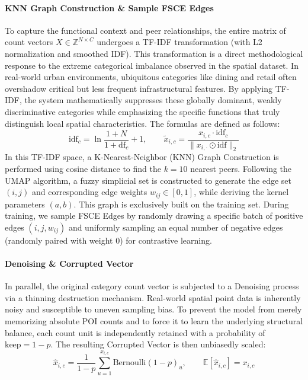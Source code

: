 \documentclass[sigconf]{acmart}
\begin{document}
\paragraph{KNN Graph Construction \& Sample FSCE Edges}
To capture the functional context and peer relationships, the entire matrix of count vectors $X\in\mathbb{Z}^{N\times C}$ undergoes a TF-IDF transformation (with L2 normalization and smoothed IDF). This transformation is a direct methodological response to the extreme categorical imbalance observed in the spatial dataset. In real-world urban environments, ubiquitous categories like dining and retail often overshadow critical but less frequent infrastructural features. By applying TF-IDF, the system mathematically suppresses these globally dominant, weakly discriminative categories while emphasizing the specific functions that truly distinguish local spatial characteristics. The formulas are defined as follows:
\begin{equation}
\text{idf}_c=\ln\frac{1+N}{1+\text{df}_c}+1,\qquad \tilde x_{i,c}=\frac{x_{i,c}\cdot\text{idf}_c}{\lVert x_{i,\cdot}\odot\text{idf}\rVert_2}
\end{equation}
In this TF-IDF space, a K-Nearest-Neighbor (KNN) Graph Construction is performed using cosine distance to find the $k=10$ nearest peers. Following the UMAP algorithm, a fuzzy simplicial set is constructed to generate the edge set $(i,j)$ and corresponding edge weights $w_{ij}\in[0,1]$, while deriving the kernel parameters $(a,b)$. This graph is exclusively built on the training set. During training, we sample FSCE Edges by randomly drawing a specific batch of positive edges $(i,j,w_{ij})$ and uniformly sampling an equal number of negative edges (randomly paired with weight 0) for contrastive learning. 

\paragraph{Denoising \& Corrupted Vector}
In parallel, the original category count vector is subjected to a Denoising process via a thinning destruction mechanism. Real-world spatial point data is inherently noisy and susceptible to uneven sampling bias. To prevent the model from merely memorizing absolute POI counts and to force it to learn the underlying structural balance, each count unit is independently retained with a probability of $\text{keep}=1-p$. The resulting Corrupted Vector is then unbiasedly scaled:
\begin{equation}
\hat x_{i,c}=\frac{1}{1-p}\sum_{u=1}^{x_{i,c}} \text{Bernoulli}(1-p)_u,\qquad \mathbb{E}[\hat x_{i,c}]=x_{i,c}
\end{equation}
\end{document}
